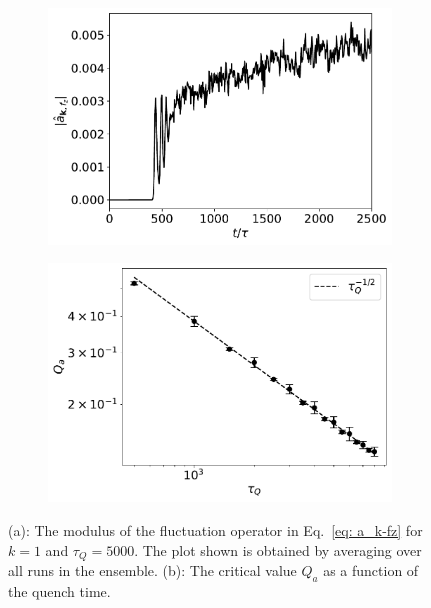 \begin{figure}[tb]
    \centering
    \begin{subfigure}{0.45\textwidth}
        \includegraphics[width=\textwidth]
        {gfx/ch-spin1/1d_BA-FM_5000_fluctuation_diff.pdf}
        \caption{\label{fig: fluctuation-diff}}
    \end{subfigure}
    \begin{subfigure}{0.45\textwidth}
        \includegraphics[width=\textwidth]{gfx/ch-spin1/BA-FM_Qa_scaling.pdf}
        \caption{\label{fig: Q_a-scaling}}
    \end{subfigure}
    \caption[Growth of the fluctuation operator]
    {(a): The modulus of the fluctuation operator in
        Eq.~\eqref{eq: a_k-fz} for \(k=1\) and
        \(\tau_Q=5000\).
        The plot shown is obtained by averaging over all runs in the ensemble.
        (b): The critical value \(Q_a\) as a function of the quench time.
    }
\end{figure}
